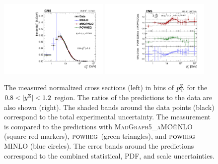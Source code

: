 \begin{figure}
	\centering
	\includegraphics[width=0.47\textwidth]{figures/zpt/zll_double_normrap2.pdf}
        \includegraphics[width=0.47\textwidth]{figures/zpt/zll_double_ratio_normrap2.pdf}
	\caption{The measured normalized cross sections (left) in bins of $p_{\mathrm{T}}^{\mathrm{Z}}$ for the $0.8 < |y^{\mathrm{Z}}| < 1.2$ region. The ratios of the predictions to the data are also shown (right). The shaded bands around the data points (black) correspond to the total experimental uncertainty. The measurement is compared to the predictions with \textsc{MadGraph5\_aMC@NLO} (square red markers),  ${\textsc{powheg}}$ (green triangles), and ${\textsc{powheg}}$-\textsc{MINLO} (blue circles). The error bands around the predictions correspond to the combined statistical, PDF, and scale uncertainties.}
	\label{fig:zll_norm2}
\end{figure}


